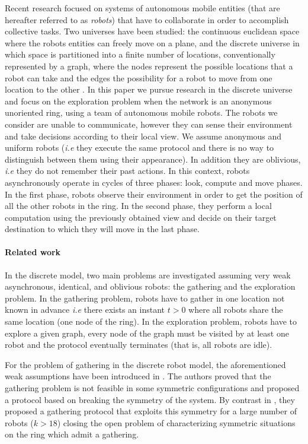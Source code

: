 \documentclass[12pt]{llncs}
\begin{document}
Recent research focused on systems of autonomous mobile entities (that are hereafter referred to as \emph{robots}) that have to collaborate in order to accomplish collective tasks. Two universes have been studied: the continuous euclidean space \cite{paol08,yama99,yoa08} where the robots entities can freely move on a plane, and the discrete universe in which space is partitioned into a finite number of locations, conventionally represented by a graph, where the nodes represent the possible locations that a robot can take and the edges the possibility for a robot to move from one location to the other \cite{paola04,kowa04,marc06,das07,klas08,Ralf08,davi07,davi08,stap09}. In this paper we pursue research in the discrete universe and focus on the exploration problem when the network is an anonymous unoriented ring, using a team of autonomous mobile robots. The robots we consider are unable to communicate, however they can sense their environment and take decisions according to their local view. We assume anonymous and uniform robots (\textit{i.e} they execute the same protocol and there is no way to distinguish between them using their appearance). In addition they are oblivious, \textit{i.e} they do not remember their past actions.  
In this context, robots asynchronously operate in cycles of three phases: look, compute and move phases. In the first phase, robots observe their environment in order to get the position of all the other robots in the ring. In the second phase, they perform a local computation using the previously obtained view and decide on their target destination to which they will move in the last phase. 

\paragraph{\textbf{Related work}}\label{sec:relWork}

In the discrete model, two main problems are investigated assuming very weak asynchronous, identical, and oblivious robots: the gathering and the exploration problem. In the gathering problem, robots have to gather in one location not known in advance \textit{i.e} there exists an instant $t>0$ where all robots share the same location (one node of the ring). In the exploration problem, robots have to explore a given graph, every node of the graph must be visited by at least one robot and the protocol eventually terminates (that is, all robots are idle). 

For the problem of gathering in the discrete robot model, the aforementioned weak assumptions have been introduced in \cite{klas08}. The authors proved that the gathering problem is not feasible in some symmetric configurations and proposed a protocol based on breaking the symmetry of the system. By contrast in \cite{Ralf08}, they proposed a gathering protocol that exploits this symmetry for a large number of robots ($k>18$) closing the open problem of characterizing symmetric situations on the ring which admit a gathering. 
\end{document}
